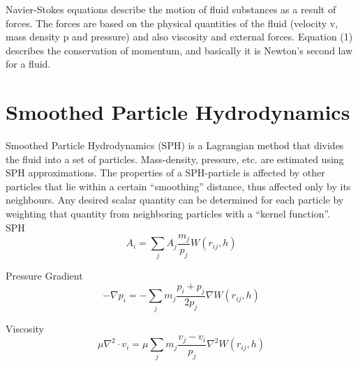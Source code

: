 \documentclass[a4paper,12pt,twoside]{report}
\begin{document}
\noindent Navier-Stokes equations describe the motion of fluid substances as a result of forces. The forces are based on the physical quantities of the fluid (velocity v, mass density p and pressure) and also viscosity and external forces. Equation (1) describes the conservation of momentum, and basically it is Newton’s second law for a fluid.




\section{Smoothed Particle Hydrodynamics}

Smoothed Particle Hydrodynamics (SPH) is a Lagrangian method that divides the fluid into a set of particles. Mass-density, pressure, etc. are estimated using SPH approximations. The properties of a SPH-particle is affected by other particles that lie within a certain “smoothing” distance, thus affected only by its neighbours. Any desired scalar quantity can be determined for each particle by weighting that quantity from neighboring particles with a “kernel function”. \\

SPH
\begin{equation}
{A_i} = {\sum_j A_j} \frac{m_j}{p_j} {W(r_{ij},h)}
\end{equation}

Pressure Gradient
\begin{equation}
{-\nabla p_i} =  {-\sum_j}{m_j}\frac{p_i + p_j}{2p_j}{\nabla W(r_{ij},h)}
\end{equation}

Viscosity
\begin{equation}
{\mu \nabla^2 \cdot v_i} = {\mu}{\sum_j}{m_j}\frac{v_j - v_i}{p_j}{\nabla^2 W(r_{ij},h)}
\end{equation}
\end{document}
